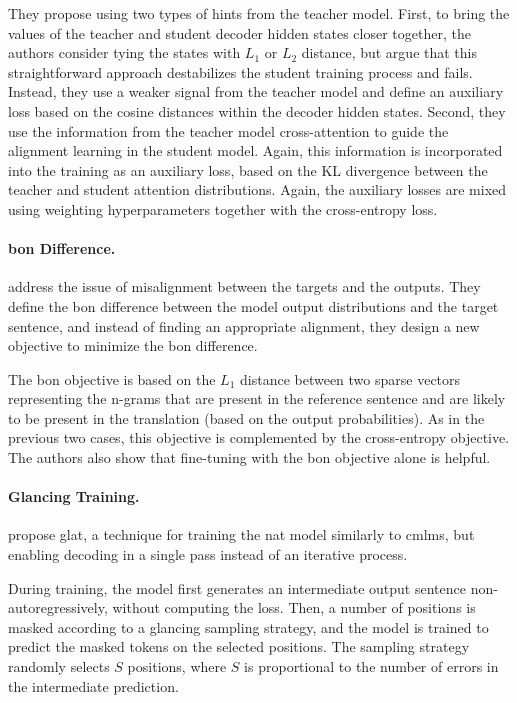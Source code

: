They propose using two types of hints from the teacher model. First, to bring
the values of the teacher and student decoder hidden states closer together,
the authors consider tying the states with $L_1$ or $L_2$ distance, but argue
that this straightforward approach destabilizes the student training process
and fails. Instead, they use a weaker signal from the teacher model and define
an auxiliary loss based on the cosine distances within the decoder hidden
states. Second, they use the information from the teacher model cross-attention
to guide the alignment learning in the student model. Again, this information
is incorporated into the training as an auxiliary loss, based on the KL
divergence between the teacher and student attention distributions.  Again, the
auxiliary losses are mixed using weighting hyperparameters together with the
cross-entropy loss. %

\paragraph{\Acl{bon} Difference.} \citet{shao2020minimizing} address the issue
of misalignment between the targets and the outputs. They define the \ac{bon}
difference between the model output distributions and the target sentence, and
instead of finding an appropriate alignment, they design a new objective to
minimize the \ac{bon} difference.

The \ac{bon} objective is based on the $L_1$ distance between two sparse
vectors representing the n-grams that are present in the reference sentence and
are likely to be present in the translation (based on the output
probabilities). As in the previous two cases, this objective is complemented by
the cross-entropy objective. The authors also show that fine-tuning with the
\ac{bon} objective alone is helpful.

\paragraph{Glancing Training.} \citet{qian-etal-2021-glancing,
  qian2021volctrans} propose \acf{glat}, a technique for
training the \ac{nat} model similarly to \acp{cmlm}, but enabling decoding in a
single pass instead of an iterative process.

During training, the model first generates an intermediate output sentence
non-autoregressively, without computing the loss. Then, a number of positions
is masked according to a glancing sampling strategy, and the model is trained
to predict the masked tokens on the selected positions. The sampling strategy
randomly selects $S$ positions, where $S$ is proportional to the number of
errors in the intermediate prediction.

